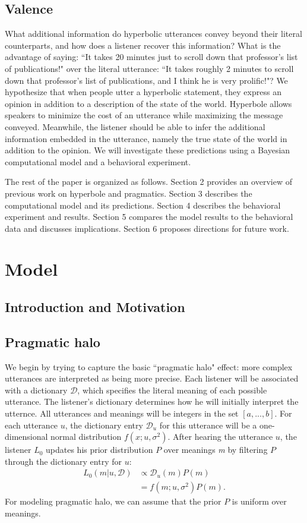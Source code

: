\documentclass{article} %
\newcommand{\dictionary}{\ensuremath{\mathcal{D}}\xspace}
\begin{document}
\subsection{Valence}
What additional information do hyperbolic utterances convey beyond their literal counterparts, and how does a listener recover this information? What is the advantage of saying: ``It takes 20 minutes just to scroll down that professor's list of publications!" over the literal utterance: ``It takes roughly 2 minutes to scroll down that professor's list of publications, and I think he is very prolific!"? We hypothesize that when people utter a hyperbolic statement, they express an opinion in addition to a description of the state of the world. Hyperbole allows speakers to minimize the cost of an utterance while maximizing the message conveyed. Meanwhile, the listener should be able to infer the additional information embedded in the utterance, namely the true state of the world in addition to the opinion. We will investigate these predictions using a Bayesian computational model and a behavioral experiment. 

The rest of the paper is organized as follows. Section 2 provides an overview of previous work on hyperbole and pragmatics. Section 3 describes the computational model and its predictions. Section 4 describes the behavioral experiment and results. Section 5 compares the model results to the behavioral data and discusses implications. Section 6 proposes directions for future work.


\section{Model}

\subsection{Introduction and Motivation}
\subsection{Pragmatic halo}

We begin by trying to capture the basic ``pragmatic halo" effect: more complex utterances are interpreted as being more precise. Each listener will be associated with a dictionary $\dictionary$, which specifies the literal meaning of each possible utterance. The listener's dictionary determines how he will initially interpret the utternce. All utterances and meanings will be integers in the set $[a,...,b]$. For each utterance $u$, the dictionary entry $\dictionary_u$ for this utterance will be a one-dimensional normal distribution $f(x;u,\sigma^2)$. After hearing the utterance $u$, the listener $L_0$ updates his prior distribution $P$ over meanings \emph{m} by filtering $P$ through the dictionary entry for $u$:
\begin{align}\label{eq:literallistener}
L_0(m | u, \dictionary) &\propto \dictionary_u(m)P(m) \\
&=f(m;u,\sigma^2)P(m).
\end{align}
For modeling pragmatic halo, we can assume that the prior $P$ is uniform over meanings.
\end{document}
